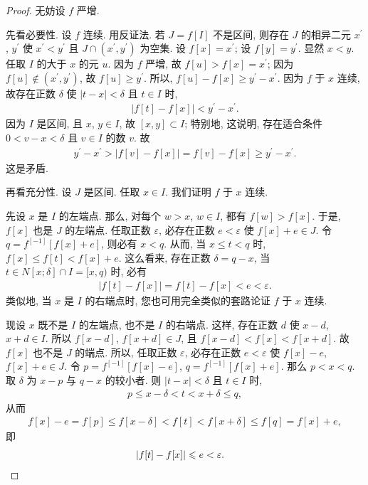 \begin{proof}
    无妨设 $f$ 严增.

    先看必要性. 设 $f$ 连续. 用反证法. 若 $J = f[I]$ 不是区间, 则存在 $J$ 的相异二元 $x^{\prime}$, $y^{\prime}$ 使 $x^{\prime} < y^{\prime}$ 且 $J \cap (x^{\prime}, y^{\prime})$ 为空集. 设 $f[x] = x^{\prime}$; 设 $f[y] = y^{\prime}$. 显然 $x < y$. 任取 $I$ 的大于 $x$ 的元 $u$. 因为 $f$ 严增, 故 $f[u] > f[x] = x^{\prime}$; 因为 $f[u] \notin (x^{\prime}, y^{\prime})$, 故 $f[u] \geq y^{\prime}$. 所以, $f[u] - f[x] \geq y^{\prime} - x^{\prime}$. 因为 $f$ 于 $x$ 连续, 故存在正数 $\delta$ 使 $|t - x| < \delta$ 且 $t \in I$ 时,
    \begin{align*}
        |f[t] - f[x]| < y^{\prime} - x^{\prime}.
    \end{align*}
    因为 $I$ 是区间, 且 $x$, $y \in I$, 故 $[x, y] \subset I$; 特别地, 这说明, 存在适合条件 $0 < v - x < \delta$ 且 $v \in I$ 的数 $v$. 故
    \begin{align*}
        y^{\prime} - x^{\prime} > |f[v] - f[x]| = f[v] - f[x] \geq y^{\prime} - x^{\prime}.
    \end{align*}
    这是矛盾.

    再看充分性. 设 $J$ 是区间. 任取 $x \in I$. 我们证明 $f$ 于 $x$ 连续.

    先设 $x$ 是 $I$ 的左端点. 那么, 对每个 $w > x$, $w \in I$, 都有 $f[w] > f[x]$. 于是, $f[x]$ 也是 $J$ 的左端点. 任取正数 $\varepsilon$, 必存在正数 $e < \varepsilon$ 使 $f[x] + e \in J$. 令 $q = f^{[-1]} [f[x] + e]$, 则必有 $x < q$. 从而, 当 $x \leq t < q$ 时, $f[x] \leq f[t] < f[x] + e$. 这么看来, 存在正数 $\delta = q - x$, 当 $t \in N[x; \delta] \cap I = [x, q)$ 时, 必有
    \begin{align*}
        |f[t] - f[x]| = f[t] - f[x] < e < \varepsilon.
    \end{align*}
    类似地, 当 $x$ 是 $I$ 的右端点时, 您也可用完全类似的套路论证 $f$ 于 $x$ 连续.

    现设 $x$ 既不是 $I$ 的左端点, 也不是 $I$ 的右端点. 这样, 存在正数 $d$ 使 $x - d$, $x + d \in I$. 所以 $f[x - d]$, $f[x + d] \in J$, 且 $f[x - d] < f[x] < f[x + d]$. 故 $f[x]$ 也不是 $J$ 的端点. 所以, 任取正数 $\varepsilon$, 必存在正数 $e < \varepsilon$ 使 $f[x] - e$, $f[x] + e \in J$. 令 $p = f^{[-1]} [f[x] - e]$, $q = f^{[-1]} [f[x] + e]$. 那么 $p < x < q$. 取 $\delta$ 为 $x - p$ 与 $q - x$ 的较小者. 则 $|t - x| < \delta$ 且 $t \in I$ 时,
    \begin{align*}
        p \leq x - \delta < t < x + \delta \leq q,
    \end{align*}
    从而
    \begin{align*}
        f[x] - e = f[p] \leq f[x - \delta] < f[t] < f[x + \delta] \leq f[q] = f[x] + e,
    \end{align*}
    即
    \begin{align*}
         & {|f[t] - f[x]| \leq e < \varepsilon.} \qedhere
    \end{align*}
\end{proof}

